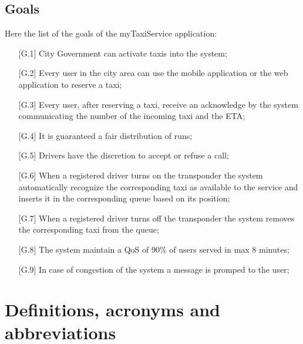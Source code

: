 \documentclass[12pt,a4paper]{book}
\begin{document}
			\subsection{Goals}
			Here the list of the goals of the myTaxiService application:
			\begin{itemize}
			 \item[\textbullet] [G.1] City Government can activate taxis into the system;
			 \item[\textbullet] [G.2] Every user in the city area can use the mobile application or the web application to reserve a taxi;
			 \item[\textbullet] [G.3] Every user, after reserving a taxi, receive an acknowledge by the system communicating the number of the incoming taxi and the ETA;
			 \item[\textbullet] [G.4] It is guaranteed a fair distribution of runs;
			 \item[\textbullet] [G.5] Drivers have the discretion to accept or refuse a call;
			 \item[\textbullet] [G.6] When a registered driver turns on the transponder the system automatically recognize the corresponding taxi as available to the service and inserts it in the corresponding queue based on its position;
			 \item[\textbullet] [G.7] When a registered driver turns off the transponder the system removes the corresponding taxi from the queue;
			 \item[\textbullet] [G.8] The system maintain a QoS of 90\% of users served in max 8 minutes;
			 \item[\textbullet] [G.9] In case of congestion of the system a message is promped to the user;
			\end{itemize}
		\section{Definitions, acronyms and abbreviations}
\end{document}
